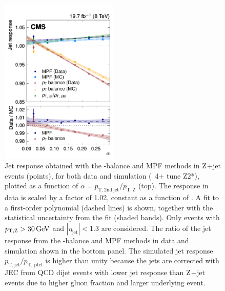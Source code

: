 \documentclass[11pt,twoside,a4paper,cmspaper,final,collab]{cms-tdr}
\begin{document}
\begin{figure}[htbp!]
\begin{center}
\includegraphics[width=0.5\textwidth]{Figure_019.pdf}
\end{center}
\caption{\label{fig:RespVSalpha} Jet response obtained with the \pt-balance and MPF methods in $\mathrm{Z}$+jet events (points), for both data and simulation ({\MADGRAPH}~4+ tune Z2*), plotted as a function of $\alpha=p_\mathrm{T,2nd~jet}/p_\mathrm{T,Z}$ (top). The response in data is scaled by a factor of 1.02, constant as a function of \pt. A fit to a first-order polynomial (dashed lines) is shown, together with the statistical uncertainty from the fit (shaded bands). Only events with $p_\mathrm{T, Z}>30\,\text{Ge\hspace{-.08em}V}$ and $|\eta_\text{jet}|<1.3$ are considered. The ratio of the jet response from the \pt-balance and MPF methods in data and simulation shown in the bottom panel.
The simulated jet response $p_\mathrm{T,jet}/p_\text{T, ptcl}$ is higher than unity because the jets are corrected with JEC from QCD dijet events with lower jet response than $\mathrm{Z}$+jet events due to higher gluon fraction and larger underlying event.
}
\end{figure}
\end{document}
